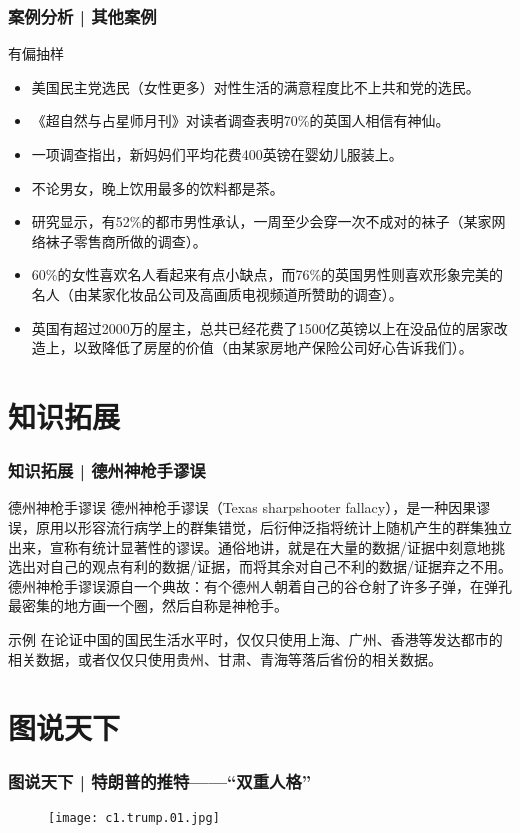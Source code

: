 \begin{frame}
  \frametitle{案例分析 | 其他案例}
  \begin{block}{有偏抽样}
    \begin{itemize}
      \item 美国民主党选民（女性更多）对性生活的满意程度比不上共和党的选民。
      \item 《超自然与占星师月刊》对读者调查表明70\%的英国人相信有神仙。
      \item 一项调查指出，新妈妈们平均花费400英镑在婴幼儿服装上。
      \item 不论男女，晚上饮用最多的饮料都是茶。
      \item 研究显示，有52\%的都市男性承认，一周至少会穿一次不成对的袜子（某家网络袜子零售商所做的调查）。
      \item 60\%的女性喜欢名人看起来有点小缺点，而76\%的英国男性则喜欢形象完美的名人（由某家化妆品公司及高画质电视频道所赞助的调查）。
      \item 英国有超过2000万的屋主，总共已经花费了1500亿英镑以上在没品位的居家改造上，以致降低了房屋的价值（由某家房地产保险公司好心告诉我们）。
    \end{itemize}
  \end{block}
\end{frame}

\section{知识拓展}
\begin{frame}
  \frametitle{知识拓展 | 德州神枪手谬误}
  \begin{block}{德州神枪手谬误}
    德州神枪手谬误（Texas sharpshooter fallacy），是一种因果谬误，原用以形容流行病学上的群集错觉，后衍伸泛指将统计上随机产生的群集独立出来，宣称有统计显著性的谬误。通俗地讲，就是在大量的数据/证据中刻意地挑选出对自己的观点有利的数据/证据，而将其余对自己不利的数据/证据弃之不用。\\
    \vspace{0.5em}
    德州神枪手谬误源自一个典故：有个德州人朝着自己的谷仓射了许多子弹，在弹孔最密集的地方画一个圈，然后自称是神枪手。
  \end{block}
  \pause
  \begin{block}{示例}
    在论证中国的国民生活水平时，仅仅只使用上海、广州、香港等发达都市的相关数据，或者仅仅只使用贵州、甘肃、青海等落后省份的相关数据。
  \end{block}
\end{frame}

\section{图说天下}
\begin{frame}
  \frametitle{图说天下 | 特朗普的推特——“双重人格”}
  \begin{figure}
    \centering
    \texttt{[image: c1.trump.01.jpg]}
  \end{figure}
\end{frame}

